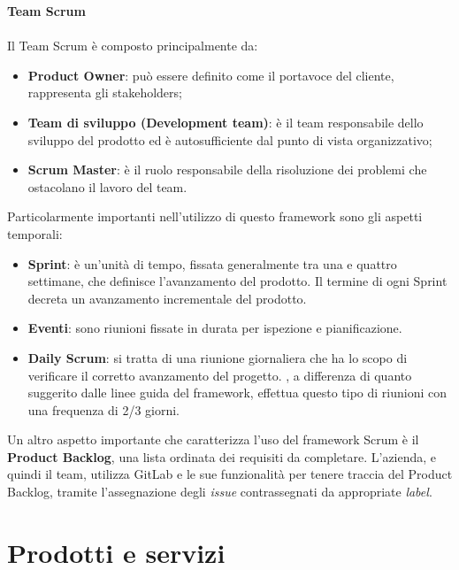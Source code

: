 \noindent \textbf{Team Scrum}\\
\\
Il Team Scrum è composto principalmente da: 
\begin{itemize}
\item \textbf{Product Owner}: può essere definito come il portavoce del cliente, rappresenta gli stakeholders;
\item \textbf{Team di sviluppo (Development team)}: è il team responsabile dello sviluppo del prodotto ed è autosufficiente dal punto di vista organizzativo;
\item \textbf{Scrum Master}: è il ruolo responsabile della risoluzione dei problemi che ostacolano il lavoro del team.
\end{itemize}

\noindent Particolarmente importanti nell'utilizzo di questo framework sono gli aspetti temporali:

\begin{itemize}
\item \textbf{Sprint}: è un'unità di tempo, fissata generalmente tra una e quattro settimane, che definisce l'avanzamento del prodotto. Il termine di ogni Sprint decreta un avanzamento incrementale del prodotto.
\item \textbf{Eventi}: sono riunioni fissate in durata per ispezione e pianificazione.
\item \textbf{Daily Scrum}: si tratta di una riunione giornaliera che ha lo scopo di verificare il corretto avanzamento del progetto. \lab{}, a differenza di quanto suggerito dalle linee guida del framework, effettua questo tipo di riunioni con una frequenza di 2/3 giorni.
\end{itemize}

\noindent Un altro aspetto importante che caratterizza l'uso del framework Scrum è il \textbf{Product Backlog}, una lista ordinata dei requisiti da completare. L'azienda, e quindi il team, utilizza GitLab e le sue funzionalità per tenere traccia del Product Backlog, tramite l'assegnazione degli \textit{issue} contrassegnati da appropriate \textit{label}.

\section{Prodotti e servizi}
